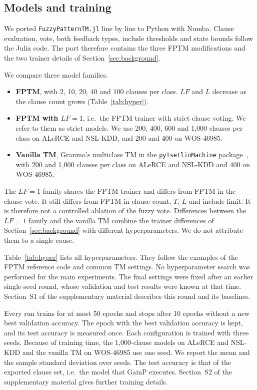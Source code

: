 \documentclass[preprint,review,12pt]{elsarticle}
\newcommand{\gainp}{GainP}
\newcommand{\LF}{\mathit{LF}}
\newcommand{\wosnew}[1]{#1}   %
\begin{document}
\subsection{Models and training}
We ported \texttt{FuzzyPatternTM.jl} line by line to Python with Numba.
Clause evaluation, vote, both feedback types, include thresholds and state bounds follow the Julia code.
The port therefore contains the three FPTM modifications and the two trainer details of Section~\ref{sec:background}.


We compare three model families.
\begin{itemize}
\item \textbf{FPTM}, with 2, 10, 20, 40 and 100 clauses per class.
$\LF$ and $L$ decrease as the clause count grows (Table~\ref{tab:hyper}).
\item \textbf{FPTM with $\LF=1$}, i.e.\ the FPTM trainer with strict clause voting. We refer to them as strict models.
We use 200, 400, 600 and 1,000 clauses per class on ALeRCE and NSL-KDD, and 200 and 400 on WOS-46985.
\item \textbf{Vanilla TM}, Granmo's multiclass TM in the \texttt{pyTsetlinMachine} package~\cite{pytsetlin}, with 200 and 1,000 clauses per class on ALeRCE and NSL-KDD and 400 on WOS-46985.

\end{itemize}
The $\LF=1$ family shares the FPTM trainer and differs from FPTM in the clause vote.
It still differs from FPTM in clause count, $T$, $L$ and include limit. It is therefore not a controlled ablation of the fuzzy vote.
Differences between the $\LF=1$ family and the vanilla TM combine the trainer differences of Section~\ref{sec:background} with different hyperparameters. We do not attribute them to a single cause.

Table~\ref{tab:hyper} lists all hyperparameters.
They follow the examples of the FPTM reference code and common TM settings. No hyperparameter search was performed for the main experiments. The final settings were fixed after an earlier single-seed round, whose validation and test results were known at that time. \wosnew{Section~S1 of the supplementary material describes this round and its baselines.}

Every run trains for at most 50 epochs and stops after 10 epochs without a new best validation accuracy.
The epoch with the best validation accuracy is kept, and its test accuracy is measured once.
Each configuration is trained with three seeds.
Because of training time, the 1,000-clause models on ALeRCE and NSL-KDD and the vanilla TM on WOS-46985 use one seed.
We report the mean and the sample standard deviation over seeds.
The test accuracy is that of the exported clause set, i.e.\ the model that \gainp{} executes.
\wosnew{Section~S2 of the supplementary material gives further training details.}
\end{document}

